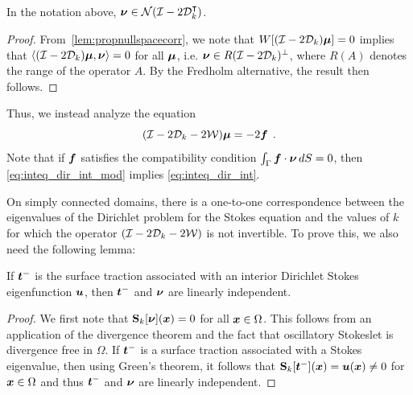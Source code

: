 \begin{lem}
  \label{lem:nunull} In the notation above,
  ${\boldsymbol \nu} \in {\mathcal N}(\mathcal I - 2{\mathcal D}_{k}^{\intercal})$.
\end{lem}
\begin{proof}
From~\cref{lem:propnullspacecorr}, we note that
$W[(\mathcal I - 2{\mathcal D}_{k}){\boldsymbol \mu}] =0$ implies that
$\left<(\mathcal I -2{\mathcal D}_{k}){\boldsymbol \mu} ,{\boldsymbol \nu} \right> = 0$ for
all ${\boldsymbol \mu}$, i.e. ${\boldsymbol \nu} \in R(\mathcal I - 2{\mathcal D}_{k})^{\perp}$, where
$R(A)$ denotes the range of the operator $A$. 
By the Fredholm alternative, the result then follows.
\end{proof}
Thus, we instead analyze the equation
\begin{equation}
(\mathcal I - 2{\mathcal D}_{k}  -2{\mathcal W}) {\boldsymbol \mu} = -2{\boldsymbol f} \; \, . \label{eq:inteq_dir_int_mod}
\end{equation}
Note that if ${\boldsymbol f}$ satisfies the compatibility
condition $\int_\Gamma {\boldsymbol f} \cdot {\boldsymbol \nu} \, dS =0$, then
\cref{eq:inteq_dir_int_mod} implies \cref{eq:inteq_dir_int}.

On simply connected domains, there is a one-to-one correspondence between
the eigenvalues of the Dirichlet problem for
the Stokes equation
and the values of $k$ for which the operator $(\mathcal I - 2{\mathcal D}_{k} - 2{\mathcal W})$
is not invertible. To prove this, we also need the 
following lemma:
\begin{lem}
  \label{lem:nutracli}
  If ${\boldsymbol t}^{-}$ is the surface traction associated
  with an interior Dirichlet Stokes eigenfunction ${\boldsymbol u}$,
  then ${\boldsymbol t}^{-}$ and ${\boldsymbol \nu}$ are linearly independent.
\end{lem}
\begin{proof}
We first note that ${\bf S}_{k}[{\boldsymbol \nu}]({\boldsymbol x}) = 0$ for all ${\boldsymbol x} \in \Omega$.
This follows from an application of the divergence
theorem and the fact that
oscillatory Stokeslet is divergence free in $\Omega$. 
If ${\boldsymbol t}^{-}$ is a surface traction associated with
a Stokes eigenvalue, then
using Green's theorem, it follows that
${\bf S}_{k}[{\boldsymbol t}^{-}]({\boldsymbol x}) = {\boldsymbol u}({\boldsymbol x}) \neq 0$ for ${\boldsymbol x} \in \Omega$ and
thus ${\boldsymbol t}^{-}$ and ${\boldsymbol \nu}$ are linearly independent.
\end{proof}

